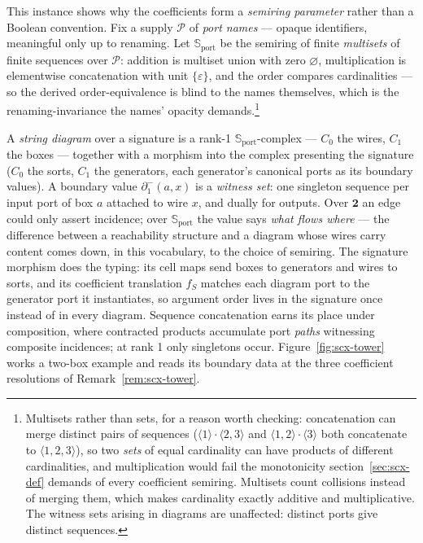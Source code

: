 This instance shows why the coefficients form a \emph{semiring
parameter} rather than a Boolean convention. Fix a supply
$\mathcal{P}$ of \emph{port names} --- opaque identifiers, meaningful
only up to renaming. Let $\mathbb{S}_{\mathrm{port}}$ be the semiring
of finite \emph{multisets} of finite sequences over $\mathcal{P}$:
addition is multiset union with zero $\varnothing$, multiplication is
elementwise concatenation with unit $\{\varepsilon\}$, and the order
compares cardinalities --- so the derived order-equivalence is blind
to the names themselves, which is the renaming-invariance the names'
opacity demands.\footnote{Multisets rather than sets, for a reason
worth checking: concatenation can merge distinct pairs of sequences
($\langle 1\rangle \cdot \langle 2,3\rangle$ and
$\langle 1,2\rangle \cdot \langle 3\rangle$ both concatenate to
$\langle 1,2,3\rangle$), so two \emph{sets} of equal cardinality can
have products of different cardinalities, and multiplication would
fail the monotonicity section~\ref{sec:scx-def} demands of every
coefficient semiring. Multisets count collisions instead of merging
them, which makes cardinality exactly additive and multiplicative.
The witness sets arising in diagrams are unaffected: distinct ports
give distinct sequences.}

A \emph{string diagram} over a signature is a rank-1
$\mathbb{S}_{\mathrm{port}}$-complex --- $C_0$ the wires, $C_1$ the
boxes --- together with a morphism into the complex presenting the
signature ($C_0$ the sorts, $C_1$ the generators, each generator's
canonical ports as its boundary values). A boundary value
$\partial_1^{-}(a, x)$ is a \emph{witness set}: one singleton
sequence per input port of box $a$ attached to wire $x$, and dually
for outputs. Over $\mathbf{2}$ an edge could only assert incidence;
over $\mathbb{S}_{\mathrm{port}}$ the value says \emph{what flows
where} --- the difference between a reachability structure and a
diagram whose wires carry content comes down, in this vocabulary, to
the choice of semiring. The signature morphism does the typing: its
cell maps send boxes to generators and wires to sorts, and its
coefficient translation $f_S$ matches each diagram port to the
generator port it instantiates, so argument order lives in the
signature once instead of in every diagram. Sequence concatenation
earns its place under composition, where contracted products
accumulate port \emph{paths} witnessing composite incidences; at
rank 1 only singletons occur. Figure~\ref{fig:scx-tower} works a
two-box example and reads its boundary data at the three coefficient
resolutions of Remark~\ref{rem:scx-tower}.

